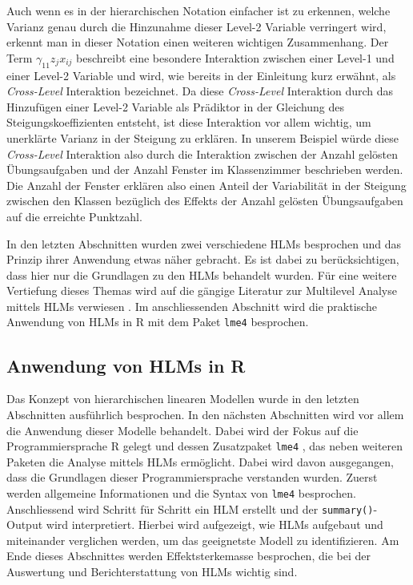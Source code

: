 \documentclass[12pt]{article}\usepackage[]{graphicx}\usepackage[]{color}
\begin{document}
Auch wenn es in der hierarchischen Notation einfacher ist zu erkennen, welche Varianz genau durch die Hinzunahme dieser Level-2 Variable verringert wird, erkennt man in dieser Notation einen weiteren wichtigen Zusammenhang. Der Term $\gamma_{11}z_{j}x_{ij}$ beschreibt eine besondere Interaktion zwischen einer Level-1 und einer Level-2 Variable und wird, wie bereits in der Einleitung kurz erwähnt, als \textit{Cross-Level} Interaktion bezeichnet. Da diese \textit{Cross-Level} Interaktion durch das Hinzufügen einer Level-2 Variable als Prädiktor in der Gleichung des Steigungskoeffizienten entsteht, ist diese Interaktion vor allem wichtig, um unerklärte Varianz in der Steigung zu erklären. In unserem Beispiel würde diese \textit{Cross-Level} Interaktion also durch die Interaktion zwischen der Anzahl gelösten Übungsaufgaben und der Anzahl Fenster im Klassenzimmer beschrieben werden. Die Anzahl der Fenster erklären also einen Anteil der Variabilität in der Steigung zwischen den Klassen bezüglich des Effekts der Anzahl gelösten Übungsaufgaben auf die erreichte Punktzahl.

In den letzten Abschnitten wurden zwei verschiedene HLMs besprochen und das Prinzip ihrer Anwendung etwas näher gebracht. Es ist dabei zu berücksichtigen, dass hier nur die Grundlagen zu den HLMs behandelt wurden. Für eine weitere Vertiefung dieses Themas wird auf die gängige Literatur zur Multilevel Analyse mittels HLMs verwiesen \citep{andrew_data, raudenbush2002hierarchical, SnijdersTomA.B2012Ma:a, twisk_2006}. Im anschliessenden Abschnitt wird die praktische Anwendung von HLMs in R mit dem Paket \texttt{lme4} \citep{batesetal2015lme4} besprochen.

\subsection{Anwendung von HLMs in R} \label{section:ml_in_R}
Das Konzept von hierarchischen linearen Modellen wurde in den letzten Abschnitten ausführlich besprochen. In den nächsten Abschnitten wird vor allem die Anwendung dieser Modelle behandelt. Dabei wird der Fokus auf die Programmiersprache R gelegt und dessen Zusatzpaket \texttt{lme4} \citep{batesetal2015lme4}, das neben weiteren Paketen die Analyse mittels HLMs ermöglicht. Dabei wird davon ausgegangen, dass die Grundlagen dieser Programmiersprache verstanden wurden. Zuerst werden allgemeine Informationen und die Syntax von \texttt{lme4} besprochen. Anschliessend wird Schritt für Schritt ein HLM erstellt und der \texttt{summary()}-Output wird interpretiert. Hierbei wird aufgezeigt, wie HLMs aufgebaut und miteinander verglichen werden, um das geeignetste Modell zu identifizieren. Am Ende dieses Abschnittes werden Effektsterkemasse besprochen, die bei der Auswertung und Berichterstattung von HLMs wichtig sind.  
\end{document}
